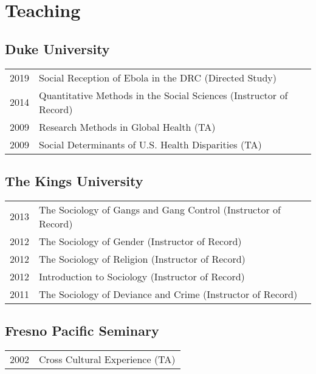 \section*{Teaching}
\subsection*{Duke University}

\begin{tabular}{p{} p{}}
2019 & Social Reception of Ebola in the DRC (Directed Study) \\
2014 & Quantitative Methods in the Social Sciences (Instructor of Record)\\
2009 & Research Methods in Global Health (TA) \\
2009 & Social Determinants of U.S. Health Disparities (TA)\\
\end{tabular}

\subsection*{The Kings University}

\begin{tabular}{p{} p{}}
2013 & The Sociology of Gangs and Gang Control (Instructor of Record)\\
2012 & The Sociology of Gender (Instructor of Record)\\
2012 & The Sociology of Religion (Instructor of Record)\\
2012 & Introduction to Sociology (Instructor of Record)\\
2011 & The Sociology of Deviance and Crime (Instructor of Record)\\
\end{tabular}

\subsection*{Fresno Pacific Seminary}

\begin{tabular}{p{} p{}}
2002 & Cross Cultural Experience (TA) \\
\end{tabular}